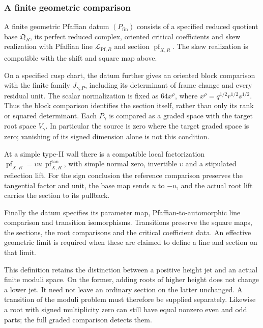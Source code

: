 \subsubsection*{A finite geometric comparison}

\begin{definition}
\label{def:finite-geometric-pfaffian-datum}
A finite geometric Pfaffian datum \((P_{\mathrm{fin}})\) consists
of a specified reduced quotient base \(\mathfrak Q_R\), its perfect
reduced complex, oriented critical coefficients and skew realization
with Pfaffian line \(\mathscr L_{\mathrm{Pf},R}\) and section
\(\operatorname{pf}_{X,R}\).  The skew realization is compatible
with the shift and square map above.

On a specified cusp chart, the datum further gives an oriented
block comparison with the finite family \(J_{\gamma,P}\), including
its determinant of frame change and every residual unit.  The scalar
normalization is fixed as
\(64x^\rho\), where \(x^\rho=q^{1/2}r^{1/2}s^{1/2}\).  Thus the
block comparison identifies the section itself, rather than only
its rank or squared determinant.  Each \(P_\gamma\) is compared as
a graded space with the target root space \(V_\gamma\).  In
particular the source is zero where the target graded space is zero;
vanishing of its signed dimension alone is not this condition.

At a simple type-II wall there is a compatible local factorization
\(\operatorname{pf}_{X,R}=\upsilon u\,
\operatorname{pf}^{\mathrm{tan}}_{X,R}\), with simple normal zero,
invertible \(\upsilon\) and a stipulated reflection lift.  For the
sign conclusion the reference comparison preserves the tangential
factor and unit, the base map sends \(u\) to \(-u\), and the actual
root lift carries the section to its pullback.

Finally the datum specifies its parameter map, Pfaffian-to-automorphic
line comparison and transition isomorphisms.  Transitions preserve
the square maps, the sections, the root comparisons and the critical
coefficient data.  An effective geometric limit is required when
these are claimed to define a line and section on that limit.
\end{definition}

This definition retains the distinction between a positive height
jet and an actual finite moduli space.  On the former, adding roots
of higher height does not change a lower jet.  It need not leave
an ordinary section on the latter unchanged.  A transition of the
moduli problem must therefore be supplied separately.  Likewise a
root with signed multiplicity zero can still have equal nonzero
even and odd parts; the full graded comparison detects them.

